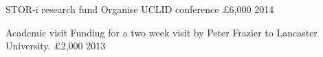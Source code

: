 \begin{cvhonors}

    \cvhonor
    {STOR-i research fund}
    {Organise UCLID conference}
    {£6,000}
    {2014}
    
     \cvhonor
    {Academic visit}
    {Funding for a two week visit by Peter Frazier to Lancaster University.}
    {£2,000}
    {2013}
\end{cvhonors}
